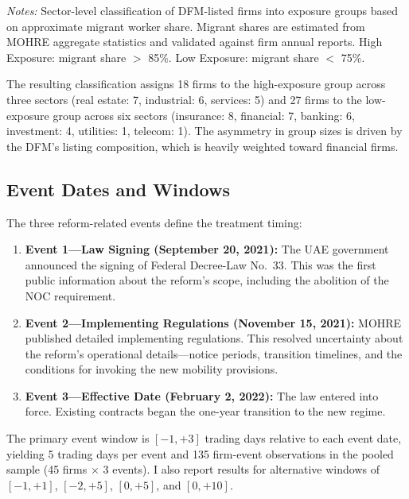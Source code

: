 \documentclass[12pt]{article}
\newcommand{\floatfoot}[1]{\par\vspace{3pt}\footnotesize\textit{Notes:} #1}
\begin{document}
\begin{table}[H]
\centering
\caption{Sector Classification and Migrant Labor Exposure}
\label{tab:classification}

\floatfoot{Sector-level classification of DFM-listed firms into exposure groups based on approximate migrant worker share. Migrant shares are estimated from MOHRE aggregate statistics and validated against firm annual reports. High Exposure: migrant share $>$ 85\%. Low Exposure: migrant share $<$ 75\%.}
\end{table}

The resulting classification assigns 18 firms to the high-exposure group across three sectors (real estate: 7, industrial: 6, services: 5) and 27 firms to the low-exposure group across six sectors (insurance: 8, financial: 7, banking: 6, investment: 4, utilities: 1, telecom: 1). The asymmetry in group sizes is driven by the DFM's listing composition, which is heavily weighted toward financial firms.

\subsection{Event Dates and Windows}

The three reform-related events define the treatment timing:

\begin{enumerate}
    \item \textbf{Event 1---Law Signing (September 20, 2021):} The UAE government announced the signing of Federal Decree-Law No.~33. This was the first public information about the reform's scope, including the abolition of the NOC requirement.

    \item \textbf{Event 2---Implementing Regulations (November 15, 2021):} MOHRE published detailed implementing regulations. This resolved uncertainty about the reform's operational details---notice periods, transition timelines, and the conditions for invoking the new mobility provisions.

    \item \textbf{Event 3---Effective Date (February 2, 2022):} The law entered into force. Existing contracts began the one-year transition to the new regime.
\end{enumerate}

The primary event window is $[-1, +3]$ trading days relative to each event date, yielding 5 trading days per event and 135 firm-event observations in the pooled sample (45 firms $\times$ 3 events). I also report results for alternative windows of $[-1, +1]$, $[-2, +5]$, $[0, +5]$, and $[0, +10]$.
\end{document}
